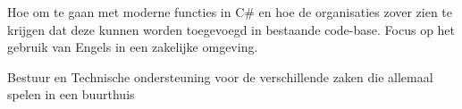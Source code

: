 \documentclass[
	a4paper,
	nameandjobposition=before,
	profilepicstyle=profilecircle
]{babelviscv}
\begin{document}
	\begin{cvtable}[1.5]
			{Hoe om te gaan met moderne functies in C\# en hoe de organisaties zover zien te krijgen dat deze kunnen worden toegevoegd in bestaande code-base.}
			{Focus op het gebruik van Engels in een zakelijke omgeving.}
	\end{cvtable}

		\begin{cvtable}[1.5]
				{Bestuur en Technische ondersteuning voor de verschillende zaken die allemaal spelen in een buurthuis}
		\end{cvtable}


\cvsignature
\end{document}
